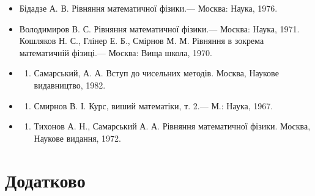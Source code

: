 \documentclass[
  ukrainian,
]{article}
\providecommand{\tightlist}{%
  \setlength{\itemsep}{0pt}\setlength{\parskip}{0pt}}
\begin{document}
\begin{itemize}
\tightlist
\item
  Бідадзе А. В. Рівняння математичної фізики.--- Москва: Наука, 1976.
\item
  Володимиров В. С. Рівняння математичної фізики.--- Москва: Наука,
  1971. Кошляков Н. С., Глінер Е. Б., Смірнов М. М. Рівняння в зокрема
  математичній фізиці.--- Москва: Вища школа, 1970.
\item
  \begin{enumerate}
  \def\labelenumi{\arabic{enumi}.}
  \setcounter{enumi}{3}
  \tightlist
  \item
    Самарський, А. А. Вступ до чисельних методів. Москва, Наукове
    видавництво, 1982.
  \end{enumerate}
\item
  \begin{enumerate}
  \def\labelenumi{\arabic{enumi}.}
  \setcounter{enumi}{4}
  \tightlist
  \item
    Смирнов В. І. Курс, виший математіки, т. 2.--- М.: Наука, 1967.
  \end{enumerate}
\item
  \begin{enumerate}
  \def\labelenumi{\arabic{enumi}.}
  \setcounter{enumi}{5}
  \tightlist
  \item
    Тихонов А. Н., Самарський А. А. Рівняння математичної фізики.
    Москва, Наукове видання, 1972.
  \end{enumerate}
\end{itemize}

\section{Додатково}\label{ux434ux43eux434ux430ux442ux43aux43eux432ux43e}
\end{document}
